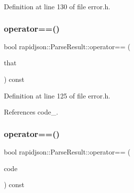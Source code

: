 Definition at line 130 of file error.\+h.


\begin{DoxyCode}{0}

\end{DoxyCode}
\mbox{\label{structrapidjson_1_1_parse_result_a53e838c5114c4770b01ba5fb4fe2ec09}} 
\subsubsection{\texorpdfstring{operator==()}{operator==()}\hspace{0.1cm}{\footnotesize\ttfamily [1/2]}}
{\footnotesize\ttfamily bool rapidjson\+::\+Parse\+Result\+::operator== (\begin{DoxyParamCaption}\item[{const \mbox{\hyperlink{structrapidjson_1_1_parse_result}{Parse\+Result}} \&}]{that }\end{DoxyParamCaption}) const}



Definition at line 125 of file error.\+h.


\begin{DoxyCode}{0}

\end{DoxyCode}


References code\+\_\+.

\mbox{\label{structrapidjson_1_1_parse_result_a512e065514f0c55c539ef70033a3f508}} 
\subsubsection{\texorpdfstring{operator==()}{operator==()}\hspace{0.1cm}{\footnotesize\ttfamily [2/2]}}
{\footnotesize\ttfamily bool rapidjson\+::\+Parse\+Result\+::operator== (\begin{DoxyParamCaption}\item[{\mbox{\hyperlink{group___r_a_p_i_d_j_s_o_n___e_r_r_o_r_s_ga7d3acf640886b1f2552dc8c4cd6dea60}{Parse\+Error\+Code}}}]{code }\end{DoxyParamCaption}) const}



